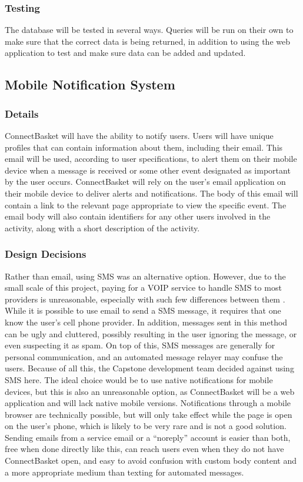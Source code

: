 \documentclass[onecolumn, draftclsnofoot,10pt, compsoc]{IEEEtran}
\begin{document}
\subsubsection{Testing}
The database will be tested in several ways. Queries will be run on their own to make sure that the correct data is being returned, in addition to using the web application to test and make sure data can be added and updated.

\subsection{Mobile Notification System}

\subsubsection{Details}
ConnectBasket will have the ability to notify users. Users will have unique profiles that can contain information about them, including their email. This email will be used, according to user specifications, to alert them on their mobile device when a message is received or some other event designated as important by the user occurs. ConnectBasket will rely on the user's email application on their mobile device to deliver alerts and notifications. The body of this email will contain a link to the relevant page appropriate to view the specific event. The email body will also contain identifiers for any other users involved in the activity, along with a short description of the activity.


\subsubsection{Design Decisions}
Rather than email, using SMS was an alternative option. However, due to the small scale of this project, paying for a VOIP service to handle SMS to most providers is unreasonable, especially with such few differences between them \cite{notifications}. While it is possible to use email to send a SMS message, it requires that one know the user's cell phone provider. In addition, messages sent in this method can be ugly and cluttered, possibly resulting in the user ignoring the message, or even suspecting it as spam. On top of this, SMS messages are generally for personal communication, and an automated message relayer may confuse the users. Because of all this, the Capstone development team decided against using SMS here. The ideal choice would be to use native notifications for mobile devices, but this is also an unreasonable option, as ConnectBasket will be a web application and will lack native mobile versions. Notifications through a mobile browser are technically possible, but will only take effect while the page is open on the user’s phone, which is likely to be very rare and is not a good solution. Sending emails from a service email or a “noreply” account is easier than both, free when done directly like this, can reach users even when they do not have ConnectBasket open, and easy to avoid confusion with custom body content and a more appropriate medium than texting for automated messages.
\end{document}
